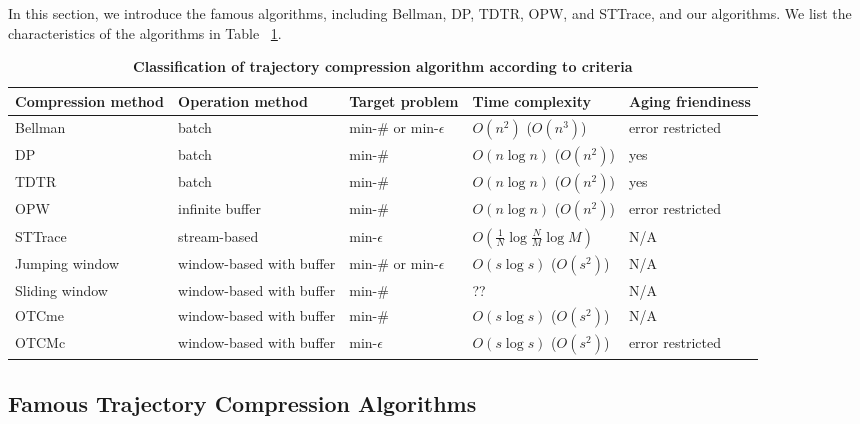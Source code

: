 \documentclass[12pt]{article}
\begin{document}
\begin{CJK}{UTF8}{bsmi}
In this section, we introduce the famous algorithms, including Bellman, DP, TDTR, OPW, and STTrace, and our algorithms. We list the characteristics of the algorithms in  Table ~\ref{tab:classification}.

\begin{table}[ht]
\caption{\bf Classification of trajectory compression algorithm according to criteria }
\begin{center}
\begin{tabular}{p{2.5cm}||p{2.3cm}p{1.5cm}p{3cm}p{3.2cm}}
\toprule 
Compression method & Operation method & Target problem & Time complexity & Aging friendiness \\
 
\midrule
Bellman  & batch & min-\# or min-$\epsilon$ & $O(n^2)$ ($O(n^3)$) & error restricted\\
\rowcolor{mygray}
DP       & batch & min-\# & $O(n\log n)$ ($O(n^2)$) & yes\\

TDTR     & batch & min-\# & $O(n\log n)$ ($O(n^2)$) & yes\\

\rowcolor{mygray}
OPW       & infinite buffer & min-\# & $O(n\log n)$ ($O(n^2)$) & error restricted\\

STTrace     & stream-based & min-$\epsilon$ & $O(\frac{1}{N}\log \frac{N}{M} \log{M})$ & N/A\\

\midrule
\midrule
\rowcolor{mygray}
Jumping window     & window-based with buffer & min-\# or min-$\epsilon$ & $O(s\log s)$ ($O(s^2)$) &  N/A\\
Sliding window     & window-based with buffer & min-\# & ?? & N/A\\

\rowcolor{mygray}
OTCme     & window-based with buffer & min-\# & $O(s\log s)$ ($O(s^2)$) & N/A\\
OTCMc     & window-based with buffer & min-$\epsilon$ & $O(s\log s)$ ($O(s^2)$) & error restricted\\


\bottomrule
\end{tabular}
\end{center}
\label{tab:classification}
\end{table}




\subsection{Famous Trajectory Compression Algorithms}




\end{CJK}
\end{document}
